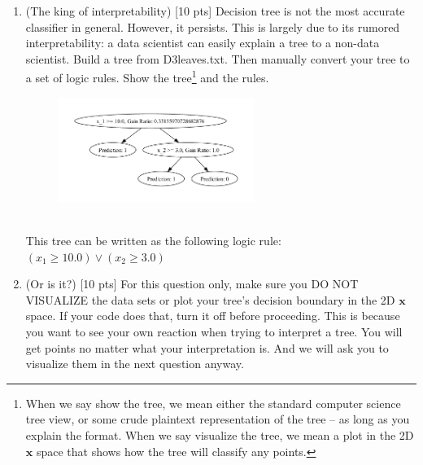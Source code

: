 \documentclass[a4paper]{article}
\theoremstyle{definition}
\def\x{\mathbf x}
\newenvironment{soln}{
    \leavevmode\color{blue}\ignorespaces
}{}
\begin{document}
\begin{enumerate}
\item (The king of interpretability)  [10 pts] Decision tree is not the most accurate classifier in general.  However, it persists.  This is largely due to its rumored interpretability: a data scientist can easily explain a tree to a non-data scientist.  Build a tree from D3leaves.txt.  Then manually convert your tree to a set of logic rules.  Show the tree\footnote{When we say show the tree, we mean either the standard computer science tree view, or some crude plaintext representation of the tree -- as long as you explain the format.  When we say visualize the tree, we mean a plot in the 2D $\x$ space that shows how the tree will classify any points.} and the rules. \\
\begin{soln}
\begin{figure}[h!]
    \centering
    \includegraphics[width=0.6\textwidth]{images/D3leavesTree.pdf}  
    \captionsetup{labelformat=empty}
    \caption{}
    \label{fig:mixed}
\end{figure}
\\
This tree can be written as the following logic rule: \\
$(x_1 \geq 10.0) \vee (x_2 \geq 3.0)$
\end{soln}


\item (Or is it?)  [10 pts] For this question only, make sure you DO NOT VISUALIZE the data sets or plot your tree's decision boundary in the 2D $\x$ space.  If your code does that, turn it off before proceeding.  This is because you want to see your own reaction when trying to interpret a tree.  You will get points no matter what your interpretation is.
And we will ask you to visualize them in the next question anyway.
  \begin{itemize}
  

\end{itemize}
\end{enumerate}
\end{document}
